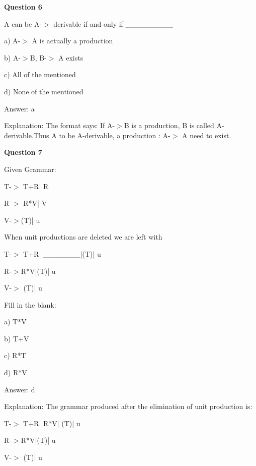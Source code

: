 \documentclass{article}
\begin{document}
\begin{mdframed}[linewidth=1pt, roundcorner=5pt, linecolor=gray!30, backgroundcolor=gray!5]
\textbf{Question 6} 

A can be A-$>$ derivable if and only if \_\_\_\_\_\_\_\_\_

a) A-$>$ A is actually a production

b) A-$>$B, B-$>$ A exists

c) All of the mentioned

d) None of the mentioned
\vspace{5pt} \par
\begin{tcolorbox}[colback=green!5, colframe=green!40!black, title=Solution]
Answer: a

Explanation: The format says: If A-$>$B is a production, B is called A-derivable.Thus A to be A-derivable, a production : A-$>$ A need to exist.
\end{tcolorbox}
\end{mdframed}

\begin{mdframed}[linewidth=1pt, roundcorner=5pt, linecolor=gray!30, backgroundcolor=gray!5]
\textbf{Question 7} 

Given Grammar:

T-$>$ T+R| R

R-$>$ R*V| V

V-$>$(T)| u

When unit productions are deleted we are left with

T-$>$ T+R| \_\_\_\_\_\_\_|(T)| u

R-$>$R*V|(T)| u

V-$>$ (T)| u

Fill in the blank:

a) T*V

b) T+V

c) R*T

d) R*V
\vspace{5pt} \par
\begin{tcolorbox}[colback=green!5, colframe=green!40!black, title=Solution]
Answer: d

Explanation: The grammar produced after the elimination of unit production is:

T-$>$ T+R| R*V| (T)| u

R-$>$R*V|(T)| u

V-$>$ (T)| u
\end{tcolorbox}
\end{mdframed}
\newpage
\end{document}
